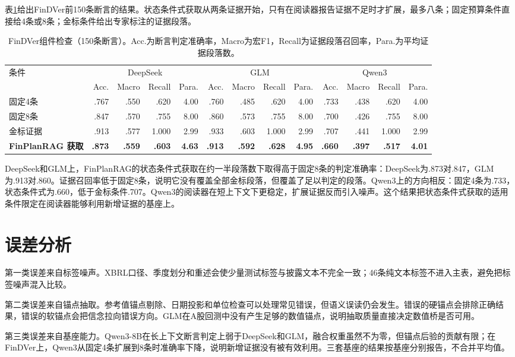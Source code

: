 表\ref{tab:findver}给出FinDVer前150条断言的结果。状态条件式获取从两条证据开始，只有在阅读器报告证据不足时才扩展，最多八条；固定预算条件直接给4条或8条；金标条件给出专家标注的证据段落。

\begin{table}[H]
\centering
{}
\setlength{\tabcolsep}{4pt}
\caption{FinDVer组件检查（150条断言）。Acc.为断言判定准确率，Macro为宏F1，Recall为证据段落召回率，Para.为平均证据段落数。}
\label{tab:findver}
\setlength{\tabcolsep}{2.2pt}
\begin{tabular}{lrrrrrrrrrrrr}
\toprule
\multirow{2}{*}{条件} & \multicolumn{4}{c}{DeepSeek} & \multicolumn{4}{c}{GLM} & \multicolumn{4}{c}{Qwen3} \\
\cmidrule(lr){2-5}\cmidrule(lr){6-9}\cmidrule(lr){10-13}
 & Acc. & Macro & Recall & Para. & Acc. & Macro & Recall & Para. & Acc. & Macro & Recall & Para. \\
\midrule
固定4条 & .767 & .550 & .620 & 4.00 & .760 & .485 & .620 & 4.00 & .733 & .438 & .620 & 4.00 \\
固定8条 & .847 & .570 & .755 & 8.00 & .860 & .573 & .755 & 8.00 & .700 & .426 & .755 & 8.00 \\
金标证据 & .913 & .577 & 1.000 & 2.99 & .933 & .603 & 1.000 & 2.99 & .707 & .441 & 1.000 & 2.99 \\
\textbf{FinPlanRAG 获取} & \textbf{.873} & \textbf{.559} & \textbf{.603} & \textbf{4.63} & \textbf{.913} & \textbf{.592} & \textbf{.628} & \textbf{4.95} & \textbf{.660} & \textbf{.397} & \textbf{.517} & \textbf{4.01} \\
\bottomrule
\end{tabular}
\end{table}

DeepSeek和GLM上，FinPlanRAG的状态条件式获取在约一半段落数下取得高于固定8条的判定准确率：DeepSeek为.873对.847，GLM为.913对.860。证据召回率低于固定8条，说明它没有覆盖全部金标段落，但覆盖了足以判定的段落。Qwen3上的方向相反：固定4条为.733，状态条件式为.660，低于金标条件.707。Qwen3的阅读器在短上下文下更稳定，扩展证据反而引入噪声。这个结果把状态条件式获取的适用条件限定在阅读器能够利用新增证据的基座上。

\section{误差分析}

第一类误差来自标签噪声。XBRL口径、季度划分和重述会使少量测试标签与披露文本不完全一致；46条纯文本标签不进入主表，避免把标签噪声混入比较。

第二类误差来自锚点抽取。参考值锚点剔除、日期投影和单位检查可以处理常见错误，但语义误读仍会发生。错误的硬锚点会排除正确结果，错误的软锚点会把信念拉向错误方向。GLM在A股回测中没有产生足够的数值锚点，说明抽取质量直接决定数值桥是否可用。

第三类误差来自基座能力。Qwen3-8B在长上下文断言判定上弱于DeepSeek和GLM，融合权重虽然不为零，但锚点后验的贡献有限；在FinDVer上，Qwen3从固定4条扩展到8条时准确率下降，说明新增证据没有被有效利用。三套基座的结果按基座分别报告，不合并平均值。
